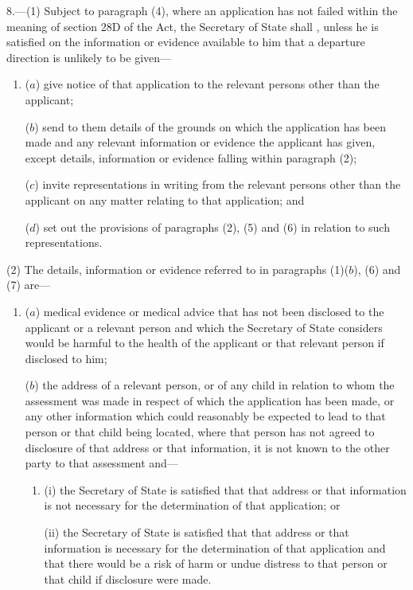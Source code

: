 \documentclass[12pt,a4paper]{article}
\begin{document}
8.—(1) Subject to
paragraph (4), where an application has not failed within the meaning of section
28D of the Act, the Secretary of State shall%
, unless he is satisfied on the information or evidence available to him that a departure direction is unlikely to be given—  %
\begin{enumerate}\item[]
($a$) give notice of that application to the relevant persons other than the
applicant;

($b$) send to them details of the grounds on which the application has been made
and any relevant information or evidence the applicant has given, except
details, information or evidence falling within paragraph (2);

($c$) invite representations in writing from the relevant persons other than the
applicant on any matter relating to that application; and

($d$) set out the provisions of paragraphs (2), (5) and (6) in relation to such
representations.
\end{enumerate}

(2) The details, information or evidence referred to in paragraphs (1)($b$), (6)
and (7) are—
\begin{enumerate}\item[]
($a$) medical evidence or medical advice that has not been disclosed to the
applicant or a relevant person and which the Secretary of State considers would
be harmful to the health of the applicant or that relevant person if disclosed
to him;

($b$) the address of a relevant person, or of any child in relation to whom the
assessment was made in respect of which the application has been made, or any
other information which could reasonably be expected to lead to that person or
that child being located, where that person has not agreed to disclosure of that
address or that information, it is not known to the other party to that
assessment and—
\begin{enumerate}\item[]
(i) the Secretary of State is satisfied that that address or that information is
not necessary for the determination of that application; or

(ii) the Secretary of State is satisfied that that address or that information is
necessary for the determination of that application and that there would be a
risk of harm or undue distress to that person or that child if disclosure were
made.
\end{enumerate}
\end{enumerate}
\end{document}
